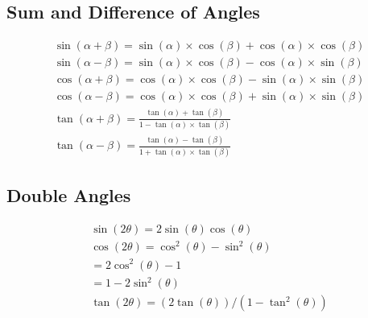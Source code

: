 \documentclass[12pt letter]{report}
\begin{document}
\subsection{Sum and Difference of Angles}
\begin{align*}
	\sin(\alpha + \beta) = \sin(\alpha) \times \cos(\beta) + \cos(\alpha) \times \cos(\beta)       \\
	\sin(\alpha-\beta) = \sin(\alpha)  \times \cos(\beta) - \cos(\alpha)  \times \sin(\beta)       \\
	\cos(\alpha+\beta) = \cos(\alpha)  \times \cos(\beta) - \sin(\alpha)  \times  \sin(\beta)      \\
	\cos(\alpha - \beta) = \cos(\alpha)  \times \cos(\beta) + \sin(\alpha)  \times  \sin(\beta)    \\
	\tan(\alpha + \beta) = \frac{\tan(\alpha) + \tan(\beta)}{1- \tan(\alpha)  \times  \tan(\beta)} \\
	\tan(\alpha - \beta) = \frac{\tan(\alpha) - \tan(\beta)}{1+ \tan(\alpha)  \times  \tan(\beta)}
\end{align*}

\subsection{Double Angles}
\begin{align*}
	\sin(2\theta) = 2\sin(\theta) \cos(\theta)      \\
	\cos(2\theta) = \cos^2(\theta) - \sin^2(\theta) \\
	= 2\cos^2(\theta) - 1                           \\
	= 1- 2 \sin^2(\theta)                           \\
	\tan(2\theta)= (2\tan(\theta))/(1 - \tan^2(\theta))
\end{align*}
\end{document}
